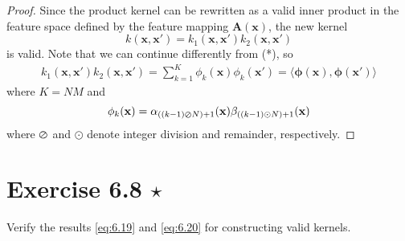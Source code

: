 \begin{proof}
    Since the product kernel can be rewritten as a valid inner product in the 
    feature space defined by the feature mapping $\mathbf{A}(\mathbf{x})$,
    the new kernel
    \begin{equation*}
        k(\mathbf{x}, \mathbf{x}')
        = k_1(\mathbf{x}, \mathbf{x}') k_2(\mathbf{x}, \mathbf{x}')
        \tag{6.18}\label{eq:6.18}
    \end{equation*}
    is valid. Note that we can continue differently from (*), so
    \begin{align*}
        k_1(\mathbf{x}, \mathbf{x}') k_2(\mathbf{x}, \mathbf{x}')
        = \sum_{k=1}^{K} \phi_k (\mathbf{x}) \phi_k(\mathbf{x}')
        = \langle \bm{\phi}(\mathbf{x}), \bm{\phi}(\mathbf{x}') \rangle
    \end{align*}
    where $K = NM$ and
    \[
        \phi_k(\mathbf{x}) 
        = \alpha_{((k - 1) \varoslash N) + 1}(\mathbf{x})
        \beta_{((k - 1) \odot N) + 1}(\mathbf{x})
    \] 
    where $\varoslash$ and $\odot$ denote integer division and remainder,
    respectively.
\end{proof}

\section*{Exercise 6.8 $\star$}
Verify the results \eqref{eq:6.19} and \eqref{eq:6.20} for constructing valid kernels.

\vspace{1em}

